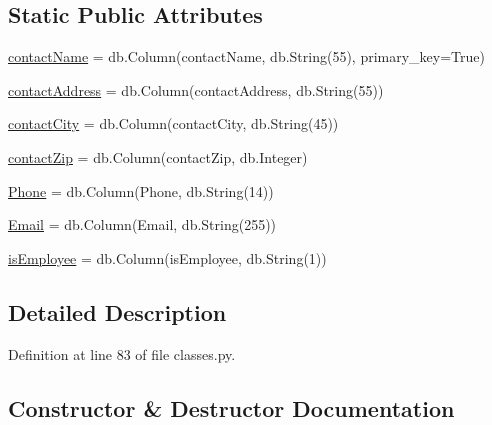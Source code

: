 \subsection*{Static Public Attributes}
\begin{DoxyCompactItemize}
\item 
\hyperlink{class_web_content_1_1classes_1_1contacts_af5b7ebdde96128f644dba2c9003395e1}{contact\+Name} = db.\+Column(\textquotesingle{}contact\+Name\textquotesingle{}, db.\+String(55), primary\+\_\+key=True)
\item 
\hyperlink{class_web_content_1_1classes_1_1contacts_aa2f4eaf4a9e2620d3f9cf92d359cb68e}{contact\+Address} = db.\+Column(\textquotesingle{}contact\+Address\textquotesingle{}, db.\+String(55))
\item 
\hyperlink{class_web_content_1_1classes_1_1contacts_ab337e819e9708c4385d88e19e5b4272a}{contact\+City} = db.\+Column(\textquotesingle{}contact\+City\textquotesingle{}, db.\+String(45))
\item 
\hyperlink{class_web_content_1_1classes_1_1contacts_aff779f52e8d69185e09157ab38bbeef2}{contact\+Zip} = db.\+Column(\textquotesingle{}contact\+Zip\textquotesingle{}, db.\+Integer)
\item 
\hyperlink{class_web_content_1_1classes_1_1contacts_aa4c26f3a90e573a3d5495dd9fea09067}{Phone} = db.\+Column(\textquotesingle{}Phone\textquotesingle{}, db.\+String(14))
\item 
\hyperlink{class_web_content_1_1classes_1_1contacts_af308c0c25a34db25695da939142548da}{Email} = db.\+Column(\textquotesingle{}Email\textquotesingle{}, db.\+String(255))
\item 
\hyperlink{class_web_content_1_1classes_1_1contacts_a6ef2db0009b3b8b0facfaf88d54b84e1}{is\+Employee} = db.\+Column(\textquotesingle{}is\+Employee\textquotesingle{}, db.\+String(1))
\end{DoxyCompactItemize}


\subsection{Detailed Description}


Definition at line 83 of file classes.\+py.



\subsection{Constructor \& Destructor Documentation}
\mbox{\label{class_web_content_1_1classes_1_1contacts_a867bb2313c6cc01e6d3fa6936257f70c}} 
